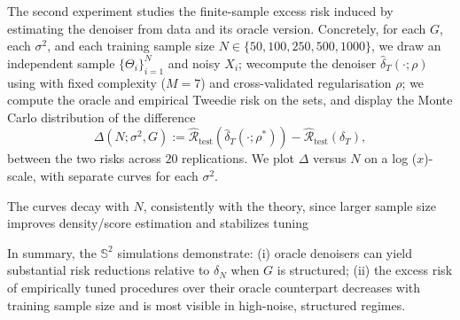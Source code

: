 \documentclass{article}
\begin{document}
The second experiment studies the finite-sample excess risk induced by estimating the denoiser from data and its oracle version. Concretely, for each $G$, each $\sigma^2$, and each training sample size $N \in \{50,100,250,500,1000\}$, we
draw an independent sample $\{\Theta_i\}_{i=1}^{N}$ and noisy $X_i$; wecompute the denoiser $\hat\delta_T(\cdot;\rho)$ using  with fixed complexity ($M=7$) and cross-validated regularisation $\rho$;  we compute the oracle and empirical  Tweedie risk on the sets, and display the Monte Carlo distribution of the difference
\[
\Delta(N;\sigma^2,G)
:= \widehat{\mathcal{R}}_{\mathrm{test}}\!\left(\hat\delta_T(\cdot;\rho^*)\right)
- \widehat{\mathcal{R}}_{\mathrm{test}}(\delta_T),
\]
 between the two risks across $20$ replications. We plot $\Delta$ versus $N$ on a log ($x$)-scale, with separate curves for each $\sigma^2$.

 The curves decay with $N$, consistently with the theory, since larger  sample size improves density/score estimation and stabilizes tuning


 In summary, the $\mathbb{S}^2$ simulations demonstrate: (i) oracle denoisers can yield substantial risk reductions relative to $\delta_N$ when $G$ is structured; (ii) the excess risk of empirically tuned procedures over their oracle counterpart decreases with training sample size and is most visible in high-noise, structured regimes.
\end{document}
